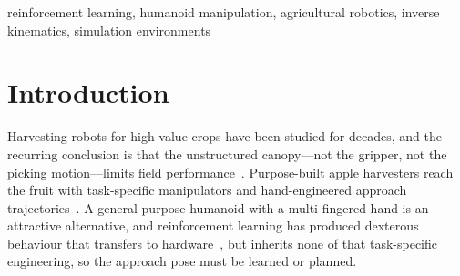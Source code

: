 \documentclass[conference,a4paper]{IEEEtran}
\begin{document}
\begin{abstract}
Robotic apple harvesting requires the hand to reach a specific point relative to
the fruit, in a specific orientation, before any grasp can succeed. We present an
open Isaac Lab environment posing this \emph{pre-grasp} problem for the Unitree
G1 humanoid with Dex3 hands, in which a procedurally randomized tree is rebuilt
every episode and the fruit is sampled directly in the shoulder's polar
coordinates so targets are geometrically varied but kinematically meaningful.
Motion smoothness is structural rather than learned: a rate-limited action term
caps commanded joint velocity and acceleration for any policy output whatsoever.
Within one interface we compare three controllers---a PPO policy, a CasADi/IPOPT
inverse-kinematics solver, and a hybrid that hands off from the first to the
second. Over \RESnepisodes{} randomized episodes the policy is fast
(\RLforward{}\,ms per decision) and reaches the position tolerance on
\RESposonly{} of episodes but cannot hold orientation, succeeding on
\RESsuccess{}; this was solved implementing a proximity stop thread. The IK solver is precise but costs \CASsolveMed{}\,ms with a
\CASsolveMax{}\,ms worst case; the hybrid reaches \HYBsuccess{} at
\HYBcompute{}\,ms per episode. We also report that a densely shaped reward with mis-specified grasp geometry
converges confidently---position terms saturate, action noise collapses---while
task success never leaves zero, and no training curve reveals it.
\end{abstract}

\begin{IEEEkeywords}
reinforcement learning, humanoid manipulation, agricultural robotics, inverse
kinematics, simulation environments
\end{IEEEkeywords}

\section{Introduction}

Harvesting robots for high-value crops have been studied for decades, and the
recurring conclusion is that the unstructured canopy---not the gripper, not the
picking motion---limits field
performance~\cite{zhang2022apple,jangali2024endeffector}. Purpose-built apple
harvesters reach the fruit with task-specific manipulators and hand-engineered
approach trajectories~\cite{zhang2022apple,zhang2024apple}. A general-purpose
humanoid with a multi-fingered hand is an attractive alternative, and
reinforcement learning has produced dexterous behaviour that transfers to
hardware~\cite{handa2023dextreme,he2025hover}, but inherits none of that
task-specific engineering, so the approach pose must be learned or planned.
\end{document}
